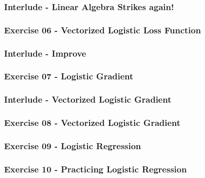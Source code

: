 \documentclass[]{article}
\begin{document}
\hypertarget{interlude---linear-algebra-strikes-again}{%
\subsubsection{Interlude - Linear Algebra Strikes
again!}\label{interlude---linear-algebra-strikes-again}}

\hypertarget{exercise-06---vectorized-logistic-loss-function}{%
\subsubsection{Exercise 06 - Vectorized Logistic Loss
Function}\label{exercise-06---vectorized-logistic-loss-function}}

\hypertarget{interlude---improve}{%
\subsubsection{Interlude - Improve}\label{interlude---improve}}

\hypertarget{exercise-07---logistic-gradient}{%
\subsubsection{Exercise 07 - Logistic
Gradient}\label{exercise-07---logistic-gradient}}

\hypertarget{interlude---vectorized-logistic-gradient}{%
\subsubsection{Interlude - Vectorized Logistic
Gradient}\label{interlude---vectorized-logistic-gradient}}

\hypertarget{exercise-08---vectorized-logistic-gradient}{%
\subsubsection{Exercise 08 - Vectorized Logistic
Gradient}\label{exercise-08---vectorized-logistic-gradient}}

\hypertarget{exercise-09---logistic-regression}{%
\subsubsection{Exercise 09 - Logistic
Regression}\label{exercise-09---logistic-regression}}

\hypertarget{exercise-10---practicing-logistic-regression}{%
\subsubsection{Exercise 10 - Practicing Logistic
Regression}\label{exercise-10---practicing-logistic-regression}}
\end{document}
